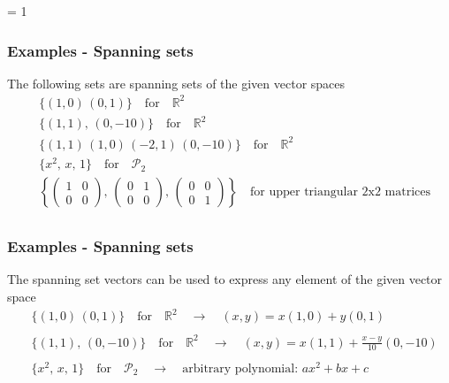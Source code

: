 \documentclass[usenames,dvipsnames,aspectratio=169,10pt]{beamer}
\def \EXAMPLEVERSION {3} %
\numberwithin{equation}{section}
\begin{document}
\ifnum \EXAMPLEVERSION = 1
\begin{frame}
\frametitle{Examples - Spanning sets}
The following sets are spanning sets of the given vector spaces
\begin{align*}
& \{ (1,0) \, (0,1) \} \quad \text{for} \quad \mathbb{R}^2 \\
& \{ (1,1), \, (0,-10) \} \quad \text{for} \quad \mathbb{R}^2 \\
& \{ (1,1) \, (1,0)\, (-2,1) \, (0,-10) \} \quad \text{for} \quad \mathbb{R}^2 \\
& \{ x^2, \, x, \, 1 \} \quad \text{for} \quad \mathcal{P}_2 \\
& \left\{ \begin{pmatrix} 1 & 0 \\ 0 & 0 \end{pmatrix},\, \begin{pmatrix} 0 & 1 \\ 0 & 0 \end{pmatrix}, \, \begin{pmatrix} 0 & 0 \\ 0 & 1 \end{pmatrix} \right\} \quad \text{for upper triangular 2x2 matrices} \\
\end{align*}
\end{frame}


\begin{frame}
\frametitle{Examples - Spanning sets}
The spanning set vectors can be used to express any element of the given vector space
\begin{align*}
& \{ (1,0) \, (0,1) \} \quad \text{for} \quad \mathbb{R}^2 \quad \longrightarrow \quad (x,y) = x(1,0) + y(0,1) \\ \\
& \{ (1,1), \, (0,-10) \} \quad \text{for} \quad \mathbb{R}^2 \quad \longrightarrow \quad (x,y) = x(1,1) + \frac{x-y}{10}(0,-10)  \\ \\
& \{ x^2, \, x, \, 1 \} \quad \text{for} \quad \mathcal{P}_2 \quad \longrightarrow \quad \text{arbitrary polynomial: } ax^2 + bx + c
\end{align*}
\end{frame}
\fi 
\end{document}
